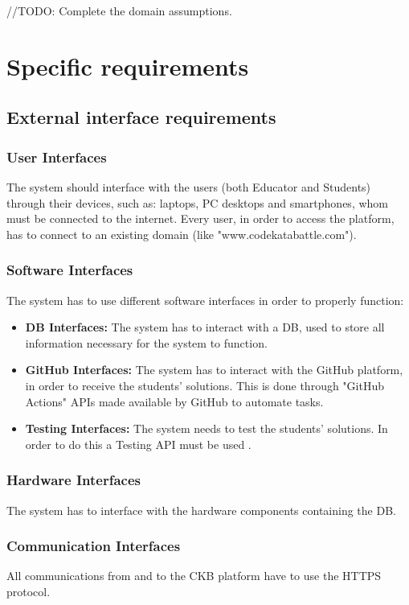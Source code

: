 \documentclass{article}
\begin{document}
{//TODO: Complete the domain assumptions.

\newpage

\pagestyle{SpecificRequirementsStyle}

\section{Specific requirements}
\subsection{External interface requirements}
\subsubsection{User Interfaces}
The system should interface with the users (both Educator and Students) through their
devices, such as: laptops, PC desktops and smartphones, whom must be connected to the internet.
Every user, in order to access the platform, has to connect to an existing domain (like "www.codekatabattle.com").

\subsubsection{Software Interfaces}
The system has to use different software interfaces in order to properly function:
\begin{itemize}
    \item \textbf{DB Interfaces:} The system has to interact with a DB,
          used to store all information necessary for the system to function.
    \item \textbf{GitHub Interfaces:} The system has to interact with the GitHub platform,
          in order to receive the students' solutions. This is done through "GitHub Actions"
          APIs made available by GitHub to automate tasks.
    \item \textbf{Testing Interfaces:} The system needs to test the students' solutions.
          In order to do this a Testing API must be used .
\end{itemize}

\subsubsection{Hardware Interfaces}
The system has to interface with the hardware components containing
the DB.
\subsubsection{Communication Interfaces}
All communications from and to the CKB platform have to use the HTTPS protocol.
}
\end{document}
